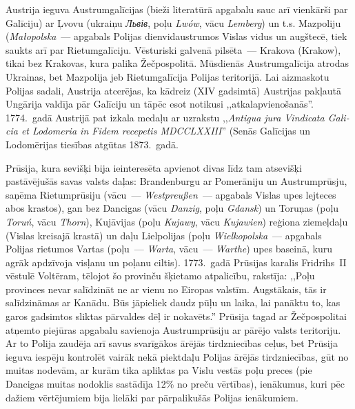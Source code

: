 \documentclass[twoside,a5paper,12pt,fleqn,openany]{extbook}
\newcommand{\pltxti}[1]{\textit{\textpolish{#1}}}
\newcommand{\detxti}[1]{\textit{\textgerman{#1}}}
\newcommand{\latxti}[1]{\textit{\textlatin{#1}}}
\newcommand{\uktxti}[1]{\textit{\textukrainian{#1}}}
\begin{document}
Austrija ieguva Austrumgalīcijas (bieži literatūrā apgabalu sauc arī vienkārši par Galīciju) ar Ļvovu (ukraiņu \uktxti{Львів}, poļu \pltxti{Lwów}, vācu \detxti{Lemberg}) un t.s. Mazpoliju (\pltxti{Małopolska}~--- apgabals Polijas dienvidaustrumos Vislas vidus un augštecē, tiek saukts arī par Rietumgalīciju. Vēsturiski galvenā pilsēta~--- Krakova (Krakow), tikai bez Krakovas, kura palika Žečpospolitā. Mūsdienās Austrumgalīcija atrodas Ukrainas, bet Mazpolija jeb Rietumgalīcija Polijas teritorijā. Lai aizmaskotu Polijas sadali, Austrija atcerējas, ka kādreiz (XIV gadsimtā) Austrijas pakļautā Ungārija valdīja pār Galīciju un tāpēc esot notikusi ,,atkalapvienošanās''. 1774.~gadā Austrijā pat izkala medaļu ar uzrakstu ,,\latxti{Antigua jura Vindicata Galicia et Lodomeria in Fidem recepetis MDCCLXXIII}'' (Senās Galīcijas un Lodomērijas tiesības atgūtas 1873.~gadā.

Prūsija, kura sevišķi bija ieinteresēta apvienot divas līdz tam atsevišķi pastāvējušās savas valsts daļas: Brandenburgu ar Pomerāniju un Austrumprūsju, saņēma Rietumprūsiju (vācu~--- \detxti{Westpreußen}~--- apgabals Vislas upes lejteces abos krastos), gan bez Dancigas (vācu \detxti{Danzig}, poļu \pltxti{Gdansk}) un Toruņas (poļu \pltxti{Toruń}, vācu \detxti{Thorn}), Kujāvijas (poļu \pltxti{Kujawy}, vācu \detxti{Kujawien}) reģiona ziemeļdaļu (Vislas kreisajā krastā) un daļu Lielpolijas (poļu \pltxti{Wielkopolska}~--- apgabals Polijas rietumos Vartas (poļu~--- \pltxti{Warta}, vācu~--- \detxti{Warthe}) upes baseinā, kuru agrāk apdzīvoja visļanu un poļanu ciltis). 1773.~gadā Prūsijas karalis Fridrihs~II vēstulē Voltēram, tēlojot šo provinču šķietamo atpalicību, rakstīja: ,,Poļu provinces nevar salīdzināt ne ar vienu no Eiropas valstīm. Augstākais, tās ir salīdzināmas ar Kanādu. Būs jāpieliek daudz pūļu un laika, lai panāktu to, kas garos gadsimtos sliktas pārvaldes dēļ ir nokavēts.'' Prūsija tagad ar Žečpospolitai atņemto piejūras apgabalu savienoja Austrumprūsiju ar pārējo valsts teritoriju. Ar to Polija zaudēja arī savus svarīgākos ārējās tirdzniecības ceļus, bet Prūsija ieguva iespēju kontrolēt vairāk nekā piektdaļu Polijas ārējās tirdzniecības, gūt no muitas nodevām, ar kurām tika apliktas pa Vislu vestās poļu preces (pie Dancigas muitas nodoklis sastādīja 12\% no preču vērtības), ienākumus, kuri pēc dažiem vērtējumiem bija lielāki par pārpalikušās Polijas ienākumiem.
\end{document}
